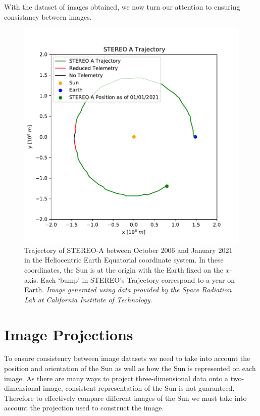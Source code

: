 \documentclass[11pt,a4paper,onecolumn]{report}
\begin{document}
With the dataset of images obtained, we now turn our attention to ensuring
consistancy between images.

\begin{figure}[ht]
  \centering
  \includegraphics[width = 0.7\linewidth]{STEREO_pos.pdf}
  \caption[STEREO-A Trajectory]{Trajectory of STEREO-A between October 2006 and January 2021 in the
  Heliocentric Earth Equatorial coordinate system. In these coordinates, the Sun
  is at the origin with the Earth fixed on the $x$-axis. Each `bump' in STEREO's
  Trajectory correspond to a year on Earth. \textit{Image generated using
  data provided by the Space Radiation Lab at California Institute of Technology.}}
  \label{fig:stereo_pos}
\end{figure}


\section{Image Projections}
\label{sec:proj}
To ensure consistency between image datasets we need to take into account the
position and orientation of the Sun as well as how the Sun is represented on
each image. As there are many ways to project three-dimensional data onto a
two-dimensional image, consistent representation of the Sun is not guaranteed.
Therefore to effectively compare different images of the Sun we must take into
account the projection used to construct the image.
\end{document}
